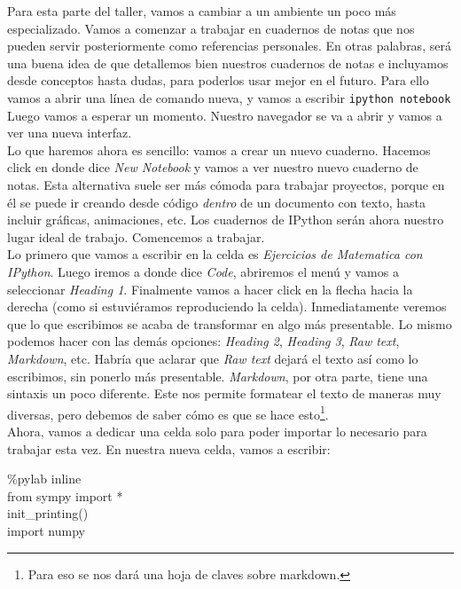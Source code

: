 \documentclass[10pt,letterpaper]{article}
\newcommand{\inlinecode}[1]{
\colorbox{light-gray}{\texttt{#1}}
}
\newenvironment{Code}
{
\begin{lrbox}{\selvestebox}%
\begin{minipage}{\dimexpr\columnwidth-2\fboxsep\relax}
\fontfamily{\ttdefault}\selectfont
}
{\end{minipage}\end{lrbox}%
\begin{center}
\colorbox{light-gray}{\usebox{\selvestebox}}
\end{center}
}
\begin{document}
Para esta parte del taller, vamos a cambiar a un ambiente un poco m\'as especializado. Vamos a comenzar a trabajar en cuadernos de notas que nos pueden servir posteriormente como referencias personales. En otras palabras, ser\'a una buena idea de que detallemos bien nuestros cuadernos de notas e incluyamos desde conceptos hasta dudas, para poderlos usar mejor en el futuro. Para ello vamos a abrir una l\'inea de comando nueva, y vamos a escribir \inlinecode{ipython notebook} Luego vamos a esperar un momento. Nuestro navegador se va a abrir y vamos a ver una nueva interfaz.\\

Lo que haremos ahora es sencillo: vamos a crear un nuevo cuaderno. Hacemos click en donde dice \textit{New Notebook} y vamos a ver nuestro nuevo cuaderno de notas. Esta alternativa suele ser m\'as c\'omoda para trabajar proyectos, porque en \'el se puede ir creando desde c\'odigo \emph{dentro} de un documento con texto, hasta incluir gr\'aficas, animaciones, etc. Los cuadernos de IPython ser\'an ahora nuestro lugar ideal de trabajo. Comencemos a trabajar.\\

Lo primero que vamos a escribir en la celda es \emph{Ejercicios de Matematica con IPython}. Luego iremos a donde dice \textit{Code}, abriremos el men\'u y vamos a seleccionar \textit{Heading 1}. Finalmente vamos a hacer click en la flecha hacia la derecha (como si estuvi\'eramos reproduciendo la celda). Inmediatamente veremos que lo que escribimos se acaba de transformar en algo m\'as presentable. Lo mismo podemos hacer con las dem\'as opciones: \textit{Heading 2}, \textit{Heading 3}, \textit{Raw text}, \textit{Markdown}, etc. Habr\'ia que aclarar que \textit{Raw text} dejar\'a el texto as\'i como lo escribimos, sin ponerlo m\'as presentable. \textit{Markdown}, por otra parte, tiene una sintaxis un poco diferente. Este nos permite formatear el texto de maneras muy diversas, pero debemos de saber c\'omo es que se hace esto\footnote{Para eso se nos dar\'a una hoja de claves sobre markdown.}.\\

Ahora, vamos a dedicar una celda solo para poder importar lo necesario para trabajar esta vez. En nuestra nueva celda, vamos a escribir:

\begin{Code}
\%pylab inline\\
from sympy import *\\
init\_printing()\\
import numpy
\end{Code}
\end{document}
